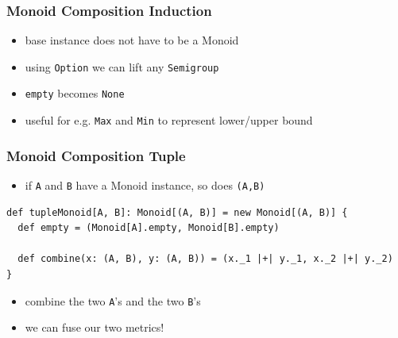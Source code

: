 \documentclass[aspectratio=169]{beamer}
\begin{document}
\begin{frame}
  \frametitle{Monoid Composition \textemdash{} Induction}
  \begin{itemize}
  \item base instance does not have to be a Monoid
  \item using \texttt{Option} we can lift any \texttt{Semigroup}
  \item \texttt{empty} becomes \texttt{None}
  \item useful for e.g. \texttt{Max} and \texttt{Min} to represent lower/upper bound
  \end{itemize}
\end{frame}

\begin{frame}[fragile]
  \frametitle{Monoid Composition \textemdash{} Tuple}
  \begin{itemize}
  \item if \texttt{A} and \texttt{B} have a Monoid instance, so does \texttt{(A,B)}
  \end{itemize}
  \begin{verbatim}
def tupleMonoid[A, B]: Monoid[(A, B)] = new Monoid[(A, B)] {
  def empty = (Monoid[A].empty, Monoid[B].empty)

  def combine(x: (A, B), y: (A, B)) = (x._1 |+| y._1, x._2 |+| y._2)
}
  \end{verbatim}
  \begin{itemize}
  \item combine the two \texttt{A}'s and the two \texttt{B}'s
  \item we can fuse our two metrics!
  \end{itemize}
\end{frame}
\end{document}
